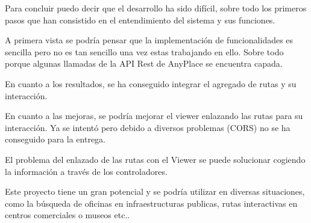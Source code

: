 
Para concluir puedo decir que el desarrollo ha sido difícil, sobre todo los primeros pasos que han consistido en el entendimiento del sistema y sus funciones.

A primera vista se podría pensar que la implementación de funcionalidades es sencilla pero no es tan sencillo una vez estas trabajando en ello. Sobre todo porque algunas llamadas de la API Rest de AnyPlace se encuentra capada.

En cuanto a los resultados, se ha conseguido integrar el agregado de rutas y su interacción.

En cuanto a las mejoras, se podría mejorar el viewer enlazando las rutas para su interacción. Ya se intentó pero debido a diversos problemas (CORS) no se ha conseguido para la entrega.

El problema del enlazado de las rutas con el Viewer se puede solucionar cogiendo la información a través de los controladores.

Este proyecto tiene un gran potencial y se podría utilizar en diversas situaciones, como la búsqueda de oficinas en infraestructuras publicas, rutas interactivas en centros comerciales o museos etc..  

